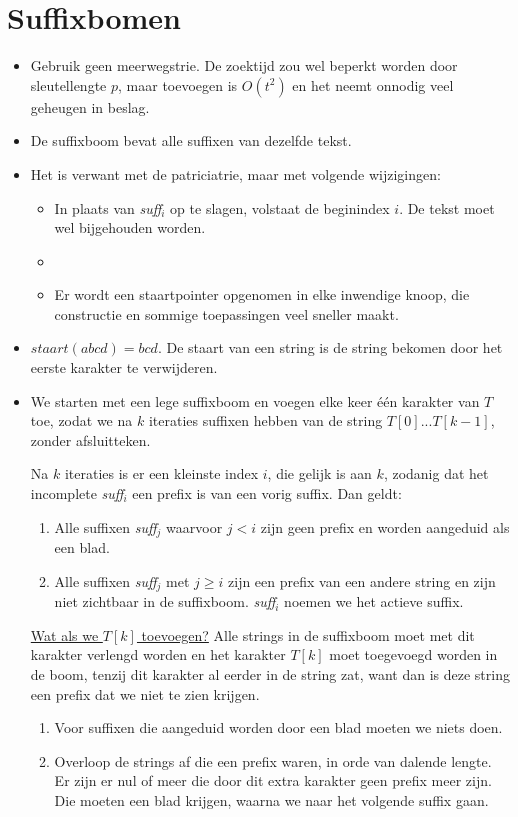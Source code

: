\documentclass{report}
\begin{document}
\section{Suffixbomen}
\begin{itemize}
	\item[\alert] Gebruik geen meerwegstrie. De zoektijd zou wel beperkt worden door sleutellengte $p$, maar toevoegen is $O(t^2)$ en het neemt onnodig veel geheugen in beslag. 
	\item[\info] De suffixboom bevat alle suffixen van dezelfde tekst.
	\item[\info] Het is verwant met de patriciatrie, maar met volgende wijzigingen:
		\begin{itemize}
			\item[\info] In plaats van \emph{suff}$_i$ op te slagen, volstaat de beginindex $i$. De tekst moet wel bijgehouden worden.
			\item[\info]  
			\item[\info] Er wordt een staartpointer opgenomen in elke inwendige knoop, die constructie en sommige toepassingen veel sneller maakt. 
		\end{itemize}
	\item[\info] $staart(abcd) = bcd$. De staart van een string is de string bekomen door het eerste karakter te verwijderen.
	\item[\info] We starten met een lege suffixboom en voegen elke keer één karakter van $T$ toe, zodat we na $k$ iteraties suffixen hebben van de string $T[0] ... T[k - 1]$, zonder afsluitteken.

	Na $k$ iteraties is er een kleinste index $i$, die gelijk is aan $k$, zodanig dat het incomplete \emph{suff}$_i$ een prefix is van een vorig suffix. Dan geldt:

	\begin{enumerate}
		\item Alle suffixen \emph{suff}$_j$ waarvoor $j < i$ zijn geen prefix en worden aangeduid als een blad.
		\item Alle suffixen \emph{suff}$_j$ met $j\geq i$ zijn een prefix van een andere string en zijn niet zichtbaar in de suffixboom. \emph{suff}$_i$ noemen we het actieve suffix.
	\end{enumerate}

	\underline{Wat als we $T[k]$ toevoegen?} Alle strings in de suffixboom moet met dit karakter verlengd worden en het karakter $T[k]$ moet toegevoegd worden in de boom, tenzij dit karakter al eerder in de string zat, want dan is deze string een prefix dat we niet te zien krijgen.
	\begin{enumerate}
		\item Voor suffixen die aangeduid worden door een blad moeten we niets doen.
		\item Overloop de strings af die een prefix waren, in orde van dalende lengte. Er zijn er nul of meer die door dit extra karakter geen prefix meer zijn. Die moeten een blad krijgen, waarna we naar het volgende suffix gaan.
	\end{enumerate}


\end{itemize}
\end{document}
